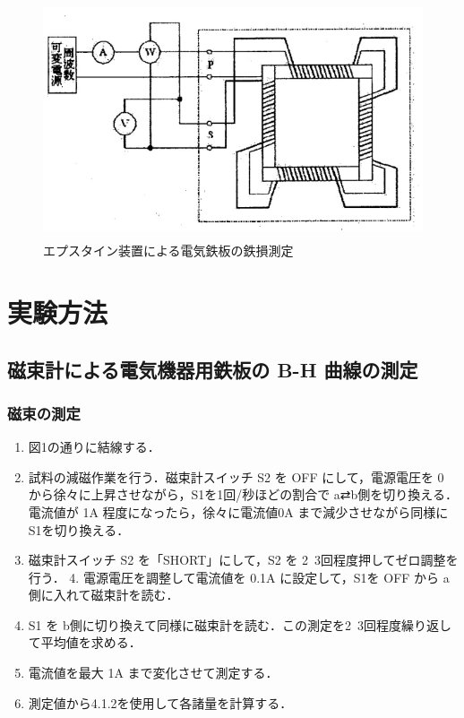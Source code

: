 \begin{figure}[H]
  \centering
  \includegraphics[height=7cm]{./fig/2.png}
  \caption{エプスタイン装置による電気鉄板の鉄損測定}
\end{figure}

\section{実験方法}
\subsection{磁束計による電気機器用鉄板の B-H 曲線の測定}
\subsubsection{磁束の測定}
\begin{enumerate}
  \item 図1の通りに結線する．
  \item 試料の減磁作業を行う．磁束計スイッチ S2 を OFF にして，電源電圧を 0 から徐々に上昇させながら，S1を1回/秒ほどの割合で a⇄b側を切り換える．電流値が 1A 程度になったら，徐々に電流値0A まで減少させながら同様に S1を切り換える．
  \item 磁束計スイッチ S2 を「SHORT」にして，S2 を 2~3回程度押してゼロ調整を行う． 4. 電源電圧を調整して電流値を 0.1A に設定して，S1を OFF から a側に入れて磁束計を読む．
  \item S1 を b側に切り換えて同様に磁束計を読む．この測定を2~3回程度繰り返して平均値を求める．
  \item 電流値を最大 1A まで変化させて測定する．
  \item 測定値から4.1.2を使用して各諸量を計算する．
\end{enumerate}


